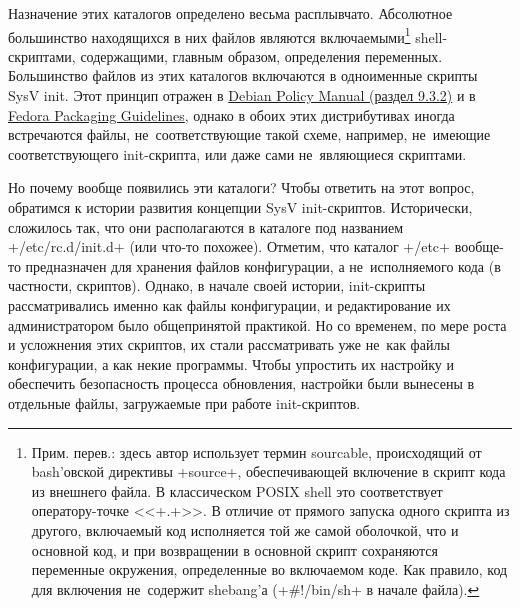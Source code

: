 \documentclass[10pt,oneside,a4paper]{article}
\begin{document}
Назначение этих каталогов определено весьма расплывчато. Абсолютное большинство
находящихся в них файлов являются включаемыми\footnote{Прим. перев.: здесь автор
использует термин sourcable, происходящий от bash'овской директивы +source+,
обеспечивающей включение в скрипт кода из внешнего файла. В классическом POSIX
shell это соответствует оператору-точке <<+.+>>. В отличие от прямого запуска
одного скрипта из другого, включаемый код исполняется той же самой оболочкой,
что и основной код, и при возвращении в основной скрипт сохраняются переменные
окружения, определенные во включаемом коде. Как правило, код для включения
не~содержит shebang'а (+#!/bin/sh+ в начале файла).} shell-скриптами, содержащими,
главным образом, определения переменных. Большинство файлов из этих каталогов
включаются в одноименные скрипты SysV init. Этот принцип отражен в
\href{http://www.debian.org/doc/debian-policy/ch-opersys.html#s-sysvinit}{Debian
Policy Manual (раздел 9.3.2)} и в
\href{http://fedoraproject.org/wiki/Packaging:SysVInitScript}{Fedora Packaging
Guidelines}, однако в обоих этих дистрибутивах иногда встречаются файлы,
не~соответствующие такой схеме, например, не~имеющие соответствующего
init-скрипта, или даже сами не~являющиеся скриптами.

Но почему вообще появились эти каталоги? Чтобы ответить на этот вопрос,
обратимся к истории развития концепции SysV init-скриптов. Исторически,
сложилось так, что они располагаются в каталоге под названием +/etc/rc.d/init.d+
(или что-то похожее).  Отметим, что каталог +/etc+ вообще-то предназначен для
хранения файлов конфигурации, а не~исполняемого кода (в частности, скриптов).
Однако, в начале своей истории, init-скрипты рассматривались именно как файлы
конфигурации, и редактирование их администратором было общепринятой практикой.
Но со временем, по мере роста и усложнения этих скриптов, их стали рассматривать
уже не~как файлы конфигурации, а как некие программы. Чтобы упростить их
настройку и обеспечить безопасность процесса обновления, настройки были вынесены
в отдельные файлы, загружаемые при работе init-скриптов.
\end{document}
